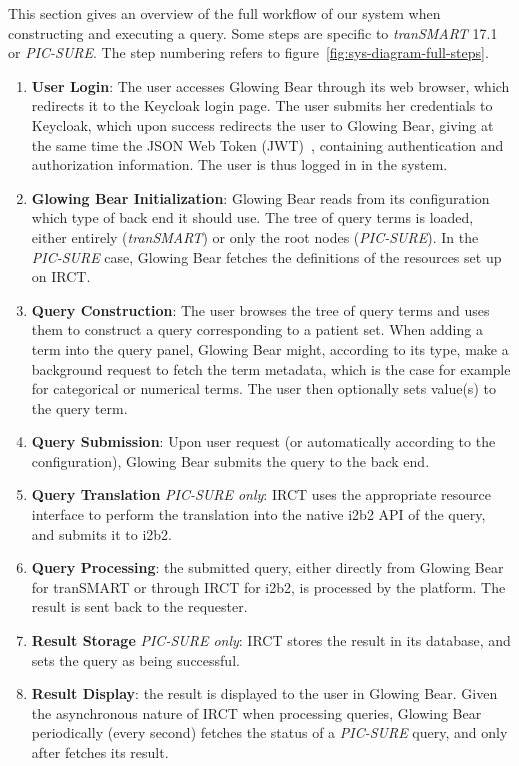 This section gives an overview of the full workflow of our system when constructing and executing a query.
Some steps are specific to \textit{tranSMART} 17.1 or \textit{PIC-SURE}.
The step numbering refers to figure~\ref{fig:sys-diagram-full-steps}.

\begin{enumerate}
\item \label{enum:wf-interop-login}\textbf{User Login}:
The user accesses Glowing Bear through its web browser, which redirects it to the Keycloak login page.
The user submits her credentials to Keycloak, which upon success redirects the user to Glowing Bear, giving at the same time the JSON Web Token (JWT)~\cite{rfc:jwt}, containing authentication and authorization information.
The user is thus logged in in the system.

\item \label{enum:wf-interop-init} \textbf{Glowing Bear Initialization}:
Glowing Bear reads from its configuration which type of back end it should use.
The tree of query terms is loaded, either entirely (\textit{tranSMART}) or only the root nodes (\textit{PIC-SURE}).
In the \textit{PIC-SURE} case, Glowing Bear fetches the definitions of the resources set up on IRCT.

\item \textbf{Query Construction}:
The user browses the tree of query terms and uses them to construct a query corresponding to a patient set.
When adding a term into the query panel, Glowing Bear might, according to its type, make a background request to fetch the term metadata, which is the case for example for categorical or numerical terms.
The user then optionally sets value(s) to the query term.

\item \textbf{Query Submission}:
Upon user request (or automatically according to the configuration), Glowing Bear submits the query to the back end.

\item \textbf{Query Translation} \textit{PIC-SURE only}: IRCT uses the appropriate resource interface to perform the translation into the native i2b2 API of the query, and submits it to i2b2.

\item \textbf{Query Processing}: the submitted query, either directly from Glowing Bear for tranSMART or through IRCT for i2b2, is processed by the platform. 
The result is sent back to the requester.

\item \textbf{Result Storage} \textit{PIC-SURE only}: IRCT stores the result in its database, and sets the query as being successful.

\item \textbf{Result Display}: the result is displayed to the user in Glowing Bear.
Given the asynchronous nature of IRCT when processing queries, Glowing Bear periodically (every second) fetches the status of a \textit{PIC-SURE} query, and only after fetches its result.

\end{enumerate}


